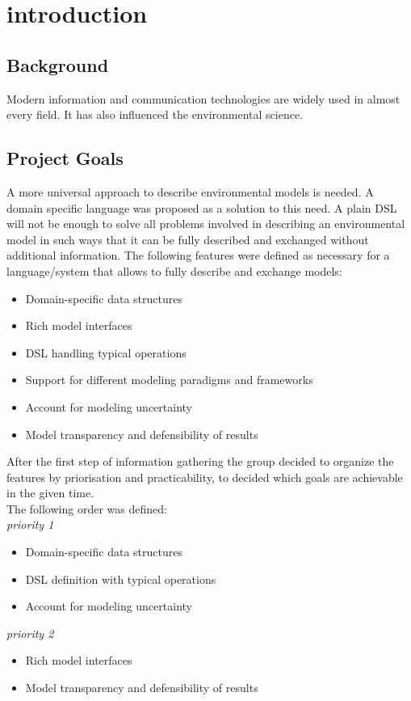 \chapter{introduction}
\section{Background}
Modern information and communication technologies are widely used in almost every field.  It has also influenced the environmental science.

\section{Project Goals}
A more universal approach to describe environmental models is needed. A domain specific language was proposed as a solution to this need. A plain DSL will not be enough to solve all problems involved in describing an environmental model in such ways that it can be fully described and exchanged without additional information. The following features were defined as necessary for a language/system that allows to fully describe and exchange models:

\begin{itemize}
	\item Domain-specific data structures
	\item Rich model interfaces
	\item DSL handling typical operations
	\item Support for different modeling paradigms and frameworks
	\item Account for modeling uncertainty
	\item Model transparency and defensibility of results
\end{itemize}

After the first step of information gathering the group decided to organize the features by priorisation and practicability, to decided which goals are achievable in the given time.\\
The following order was defined:\\
\emph{priority 1}
\begin{itemize}
	\item Domain-specific data structures
	\item DSL definition with typical operations
	\item Account for modeling uncertainty
\end{itemize}

\emph{priority 2}
\begin{itemize}
	\item Rich model interfaces
	\item Model transparency and defensibility of results
\end{itemize}

